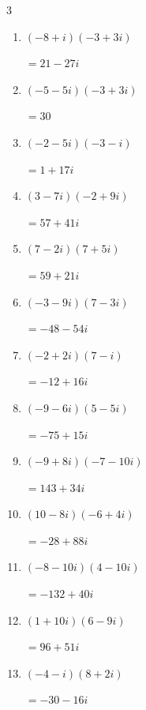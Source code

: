 \begin{multicols}{3}
\begin{enumerate}
        $\displaystyle =11+7i$

  \item $\displaystyle (-8+i)(-3+3i)$

        $\displaystyle =21-27i$

  \item $\displaystyle (-5-5i)(-3+3i)$

        $\displaystyle =30$

  \item $\displaystyle (-2-5i)(-3-i)$

        $\displaystyle =1+17i$

  \item $\displaystyle (3-7i)(-2+9i)$

        $\displaystyle =57+41i$

  \item $\displaystyle (7-2i)(7+5i)$

        $\displaystyle =59+21i$

  \item $\displaystyle (-3-9i)(7-3i)$

        $\displaystyle =-48-54i$

  \item $\displaystyle (-2+2i)(7-i)$

        $\displaystyle =-12+16i$

  \item $\displaystyle (-9-6i)(5-5i)$

        $\displaystyle =-75+15i$

  \item $\displaystyle (-9+8i)(-7-10i)$

        $\displaystyle =143+34i$

  \item $\displaystyle (10-8i)(-6+4i)$

        $\displaystyle =-28+88i$

  \item $\displaystyle (-8-10i)(4-10i)$

        $\displaystyle =-132+40i$

\columnbreak %

  \item $\displaystyle (1+10i)(6-9i)$

        $\displaystyle =96+51i$

  \item $\displaystyle (-4-i)(8+2i)$

        $\displaystyle =-30-16i$


\end{enumerate}
\end{multicols}
